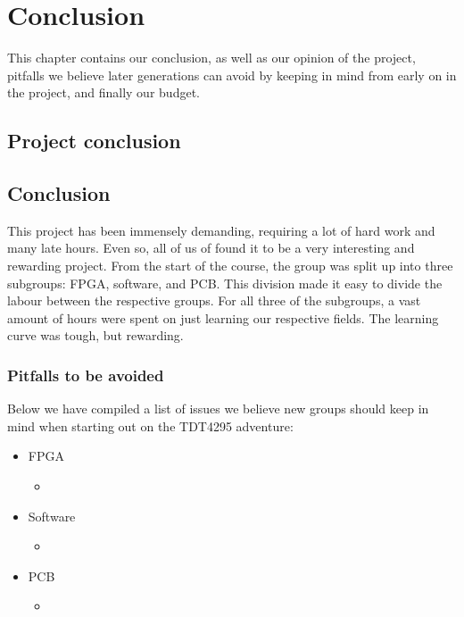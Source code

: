 
\chapter{Conclusion}

This chapter contains our conclusion, as well as our opinion of the project,
pitfalls we believe later generations can avoid by keeping in mind from early on
in the project, and finally our budget.

\clearpage
\section{Project conclusion}

\clearpage


\clearpage
\section{Conclusion}

This project has been immensely demanding, requiring a lot of hard work and many
late hours. Even so, all of us of found it to be
a very interesting and rewarding project. From the start of the course, the
group was split up into three subgroups: FPGA, software, and PCB. This division
made it easy to divide the labour between the respective groups. For
all three of the subgroups, a vast amount of hours were spent on just learning our
respective fields. The learning curve was tough, but rewarding. 



\subsection{Pitfalls to be avoided}\label{conclusion:pitfalls}

Below we have compiled a list of issues we believe new groups should keep in
mind when starting out on the TDT4295 adventure:

\begin{itemize}
	\item FPGA
	\begin{itemize}
		\item
	\end{itemize}
	\item Software
	\begin{itemize}
		\item
	\end{itemize}
	\item PCB
	\begin{itemize}
		\item
	\end{itemize}
\end{itemize}

